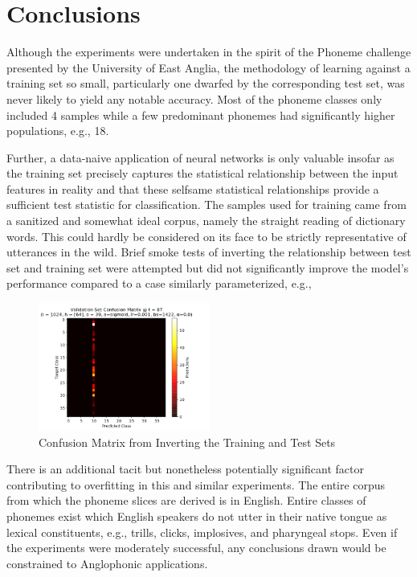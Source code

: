 \documentclass[10pt,epsf]{article}
\begin{document}
\section{Conclusions}{
  Although the experiments were undertaken in the spirit of the Phoneme challenge presented by
  the University of East Anglia, the methodology of learning against a training set so small,
  particularly one dwarfed by the corresponding test set, was never likely to yield any notable accuracy.
  Most of the phoneme classes only included 4 samples while a few predominant phonemes had
  significantly higher populations, e.g., 18.

  Further, a data-naive application of neural networks is only valuable insofar as the training set
  precisely captures the statistical relationship between the input features in reality and that
  these selfsame statistical relationships provide a sufficient test statistic for classification.
  The samples used for training came from a sanitized and somewhat ideal corpus, namely the straight
  reading of dictionary words. This could hardly be considered on its face to be strictly representative
  of utterances in the wild. Brief smoke tests of inverting the relationship between test set and training
  set were attempted but did not significantly improve the model's performance compared to a case
  similarly parameterized, e.g.,

  \begin{figure}[H]
    \centering
    \includegraphics[width=0.5\textwidth]{./img/inverted-smoke-test-confusion-matrix.png}
    \caption{Confusion Matrix from Inverting the Training and Test Sets}
    \label{fig:inv-cm}
  \end{figure}

  There is an additional tacit but nonetheless potentially significant factor contributing to overfitting
  in this and similar experiments. The entire corpus from which the phoneme slices are derived is
  in English. Entire classes of phonemes exist which English speakers do not utter in their native tongue
  as lexical constituents, e.g., trills, clicks, implosives, and pharyngeal stops. Even if the
  experiments were moderately successful, any conclusions drawn would be constrained to Anglophonic
  applications.

}
\end{document}
